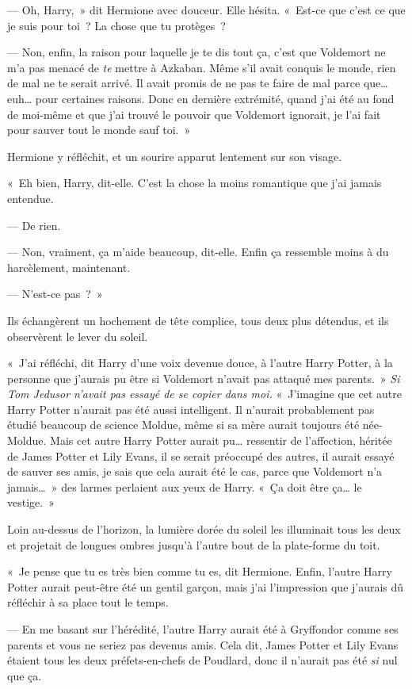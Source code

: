 --- Oh, Harry,~» dit Hermione avec douceur. Elle hésita. «~Est-ce que c'est ce que je suis pour toi~? La chose que tu protèges~?

--- Non, enfin, la raison pour laquelle je te dis tout ça, c'est que Voldemort ne m'a pas menacé de \emph{te} mettre à Azkaban. Même s'il avait conquis le monde, rien de mal ne te serait arrivé. Il avait promis de ne pas te faire de mal parce que… euh… pour certaines raisons. Donc en dernière extrémité, quand j'ai été au fond de moi-même et que j'ai trouvé le pouvoir que Voldemort ignorait, je l'ai fait pour sauver tout le monde sauf toi.~»

Hermione y réfléchit, et un sourire apparut lentement sur son visage.

«~Eh bien, Harry, dit-elle. C'est la chose la moins romantique que j'ai jamais entendue.

--- De rien.

--- Non, vraiment, ça m'aide beaucoup, dit-elle. Enfin ça ressemble moins à du harcèlement, maintenant.

--- N'est-ce pas~?~»

Ils échangèrent un hochement de tête complice, tous deux plus détendus, et ils observèrent le lever du soleil.

«~J'ai réfléchi, dit Harry d'une voix devenue douce, à l'autre Harry Potter, à la personne que j'aurais pu être si Voldemort n'avait pas attaqué mes parents.~» \emph{Si Tom Jedusor n'avait pas essayé de se copier dans moi.} «~J'imagine que cet autre Harry Potter n'aurait pas été aussi intelligent. Il n'aurait probablement pas étudié beaucoup de science Moldue, même si sa mère aurait toujours été née-Moldue. Mais cet autre Harry Potter aurait pu… ressentir de l'affection, héritée de James Potter et Lily Evans, il se serait préoccupé des autres, il aurait essayé de sauver ses amis, je sais que cela aurait été le cas, parce que Voldemort n'a jamais…~» des larmes perlaient aux yeux de Harry. «~Ça doit être ça… le vestige.~»

Loin au-dessus de l'horizon, la lumière dorée du soleil les illuminait tous les deux et projetait de longues ombres jusqu'à l'autre bout de la plate-forme du toit.

«~Je pense que tu es très bien comme tu es, dit Hermione. Enfin, l'autre Harry Potter aurait peut-être été un gentil garçon, mais j'ai l'impression que j'aurais dû réfléchir à sa place tout le temps.

--- En me basant sur l'hérédité, l'autre Harry aurait été à Gryffondor comme ses parents et vous ne seriez pas devenus amis. Cela dit, James Potter et Lily Evans étaient tous les deux préfets-en-chefs de Poudlard, donc il n'aurait pas été \emph{si} nul que ça.


